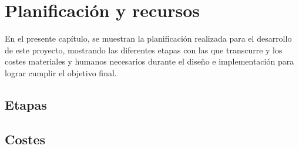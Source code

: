 \chapter{Planificación y recursos}
En el presente capítulo, se muestran la planificación realizada para el desarrollo de este proyecto, mostrando las diferentes etapas con las que transcurre y los costes materiales y humanos necesarios durante el diseño e implementación  para lograr cumplir el objetivo final.

\section{Etapas}

\section{Costes}